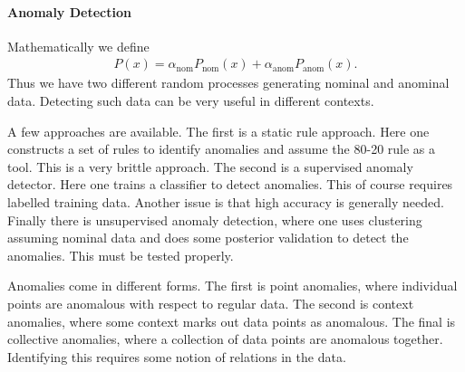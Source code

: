 \paragraph{Anomaly Detection}
Mathematically we define
\begin{align*}
	P(x) = \alpha_{\text{nom}}P_{\text{nom}}(x) + \alpha_{\text{anom}}P_{\text{anom}}(x).
\end{align*}
Thus we have two different random processes generating nominal and anominal data. Detecting such data can be very useful in different contexts.

A few approaches are available. The first is a static rule approach. Here one constructs a set of rules to identify anomalies and assume the 80-20 rule as a tool.  This is a very brittle approach. The second is a supervised anomaly detector. Here one trains a classifier to detect anomalies. This of course requires labelled training data. Another issue is that high accuracy is generally needed. Finally there is unsupervised anomaly detection, where one uses clustering assuming nominal data and does some posterior validation to detect the anomalies. This must be tested properly.

Anomalies come in different forms. The first is point anomalies, where individual points are anomalous with respect to regular data. The second is context anomalies, where some context marks out data points as anomalous. The final is collective anomalies, where a collection of data points are anomalous together. Identifying this requires some notion of relations in the data. 
